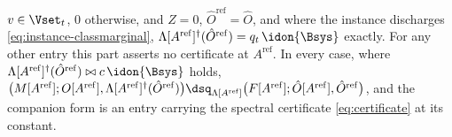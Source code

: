 \begin{corollary}
\begin{enumerate}[label=(\roman*),leftmargin=3.0em]
  $v\in\Vset_t$, $0$ otherwise, and $Z=0$, $\hat O^{\mathrm{ref}}=\hat O$,
  and where the instance discharges \eqref{eq:instance-classmarginal},
  $\Lambda[A^{\mathrm{ref}}]^{\dagger}(\hat O^{\mathrm{ref}})=q_t\,\idon{\Bsys}$
  exactly. For any other entry this part asserts no certificate at
  $A^{\mathrm{ref}}$. In every case, where
  $\Lambda[A^{\mathrm{ref}}]^{\dagger}(\hat O^{\mathrm{ref}})\bowtie
  c\,\idon{\Bsys}$ holds,
  $\big(M[A^{\mathrm{ref}}];O[A^{\mathrm{ref}}],
  \Lambda[A^{\mathrm{ref}}]^{\dagger}(\hat O^{\mathrm{ref}})\big)
  \dsq_{\Lambda[A^{\mathrm{ref}}]}
  \big(F[A^{\mathrm{ref}}];\hat O[A^{\mathrm{ref}}],\hat O^{\mathrm{ref}}\big)$,
  and the companion form is an entry carrying the spectral certificate
  \eqref{eq:certificate} at its constant.
\end{enumerate}
\end{corollary}

